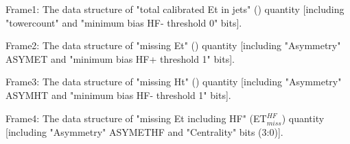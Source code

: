 Frame1: The data structure of "total calibrated Et in jets" (\htt) quantity [including "towercount" and "minimum bias HF- threshold 0" bits].

Frame2: The data structure of "missing Et" (\etm) quantity [including "Asymmetry" ASYMET and "minimum bias HF+ threshold 1" bits].

Frame3: The data structure of "missing Ht" (\htm) quantity [including "Asymmetry" ASYMHT and "minimum bias HF- threshold 1" bits].

Frame4: The data structure of "missing Et including HF" (ET$_{miss}^{HF}$) quantity [including "Asymmetry" ASYMETHF and "Centrality" bits (3:0)].

